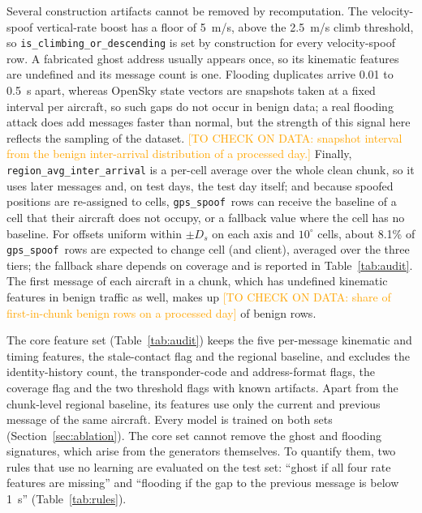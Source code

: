\documentclass[conference]{IEEEtran}
\newcommand{\tocheck}[1]{\textcolor{orange}{[TO CHECK ON DATA: #1]}}
\newcommand{\gps}{\texttt{gps\_spoof}}
\begin{document}
Several construction artifacts cannot be removed by recomputation. The velocity-spoof vertical-rate boost has a floor of 5~m/s, above the 2.5~m/s climb threshold, so \texttt{is\_climbing\_or\_descending} is set by construction for every velocity-spoof row. A fabricated ghost address usually appears once, so its kinematic features are undefined and its message count is one. Flooding duplicates arrive 0.01 to 0.5~s apart, whereas OpenSky state vectors are snapshots taken at a fixed interval per aircraft, so such gaps do not occur in benign data; a real flooding attack does add messages faster than normal, but the strength of this signal here reflects the sampling of the dataset. \tocheck{snapshot interval from the benign inter-arrival distribution of a processed day.} Finally, \texttt{region\_avg\_inter\_arrival} is a per-cell average over the whole clean chunk, so it uses later messages and, on test days, the test day itself; and because spoofed positions are re-assigned to cells, \gps\ rows can receive the baseline of a cell that their aircraft does not occupy, or a fallback value where the cell has no baseline. For offsets uniform within $\pm D_s$ on each axis and $10^\circ$ cells, about 8.1\% of \gps\ rows are expected to change cell (and client), averaged over the three tiers; the fallback share depends on coverage and is reported in Table~\ref{tab:audit}. The first message of each aircraft in a chunk, which has undefined kinematic features in benign traffic as well, makes up \tocheck{share of first-in-chunk benign rows on a processed day} of benign rows.

The core feature set (Table~\ref{tab:audit}) keeps the five per-message kinematic and timing features, the stale-contact flag and the regional baseline, and excludes the identity-history count, the transponder-code and address-format flags, the coverage flag and the two threshold flags with known artifacts. Apart from the chunk-level regional baseline, its features use only the current and previous message of the same aircraft. Every model is trained on both sets (Section~\ref{sec:ablation}). The core set cannot remove the ghost and flooding signatures, which arise from the generators themselves. To quantify them, two rules that use no learning are evaluated on the test set: ``ghost if all four rate features are missing'' and ``flooding if the gap to the previous message is below 1~s'' (Table~\ref{tab:rules}).
\end{document}

